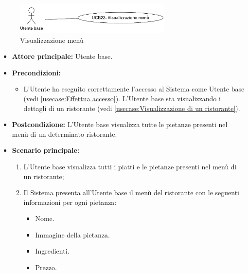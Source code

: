 \newpage
{}
\label{usecase:Visualizzazione menù}

\begin{figure}[h]
	\centering
	\includegraphics[width=0.7\textwidth]{./uml/UCB22.png} 
	\caption{Visualizzazione menù}
	\label{fig:UCB22}
  \end{figure}


\begin{itemize}
	\item \textbf{Attore principale:} Utente base.

	\item \textbf{Precondizioni:}
	      \begin{itemize}
		      \item L'Utente ha eseguito correttamente l'accesso al Sistema come
		            Utente base (vedi \autoref{usecase:Effettua accesso}).
					L'Utente base sta visualizzando i dettagli di un ristorante (vedi \autoref{usecase:Visualizzazione di un ristorante}).
	      \end{itemize}

	\item \textbf{Postcondizione:} L'Utente base visualizza tutte le pietanze presenti nel menù di un determinato ristorante.

	\item \textbf{Scenario principale:}
	      \begin{enumerate}
		      \item L'Utente base visualizza tutti i piatti e le pietanze presenti nel menù di un ristorante;
		      \item Il Sistema presenta all'Utente base il menù del ristorante con le seguenti informazioni per ogni pietanza:
		            \begin{itemize}
			            \item Nome.
			            \item Immagine della pietanza.
			            \item Ingredienti.
			            \item Prezzo.
		            \end{itemize}
	      \end{enumerate}
\end{itemize}
